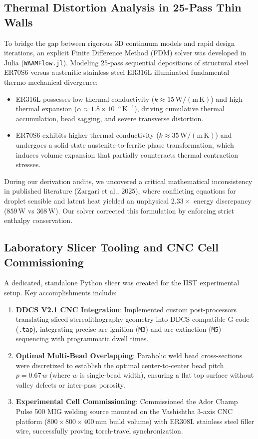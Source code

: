 \documentclass[10pt,a4paper]{article}
\begin{document}
\subsection{Thermal Distortion Analysis in 25-Pass Thin Walls}
To bridge the gap between rigorous 3D continuum models and rapid design iterations, an explicit Finite Difference Method (FDM) solver was developed in Julia (\texttt{WAAMFlow.jl}). Modeling 25-pass sequential depositions of structural steel ER70S6 versus austenitic stainless steel ER316L illuminated fundamental thermo-mechanical divergence:
\begin{itemize}
    \item ER316L possesses low thermal conductivity (\(k \approx 15\,\mathrm{W/(m\,K)}\)) and high thermal expansion (\(\alpha \approx 1.8\times 10^{-5}\,\mathrm{K^{-1}}\)), driving cumulative thermal accumulation, bead sagging, and severe transverse distortion.
    \item ER70S6 exhibits higher thermal conductivity (\(k \approx 35\,\mathrm{W/(m\,K)}\)) and undergoes a solid-state austenite-to-ferrite phase transformation, which induces volume expansion that partially counteracts thermal contraction stresses.
\end{itemize}

During our derivation audits, we uncovered a critical mathematical inconsistency in published literature (Zargari et al., 2025), where conflicting equations for droplet sensible and latent heat yielded an unphysical \(2.33\times\) energy discrepancy (\(859\,\mathrm{W}\) vs \(368\,\mathrm{W}\)). Our solver corrected this formulation by enforcing strict enthalpy conservation.

\subsection{Laboratory Slicer Tooling and CNC Cell Commissioning}
A dedicated, standalone Python slicer was created for the IIST experimental setup. Key accomplishments include:
\begin{enumerate}
    \item \textbf{DDCS V2.1 CNC Integration}: Implemented custom post-processors translating sliced stereolithography geometry into DDCS-compatible G-code (\texttt{.tap}), integrating precise arc ignition (\texttt{M3}) and arc extinction (\texttt{M5}) sequencing with programmatic dwell times.
    \item \textbf{Optimal Multi-Bead Overlapping}: Parabolic weld bead cross-sections were discretized to establish the optimal center-to-center bead pitch \(p = 0.67\,w\) (where \(w\) is single-bead width), ensuring a flat top surface without valley defects or inter-pass porosity.
    \item \textbf{Experimental Cell Commissioning}: Commissioned the Ador Champ Pulse 500 MIG welding source mounted on the Vashishtha 3-axis CNC platform (\(800\times 800\times 400\,\mathrm{mm}\) build volume) with ER308L stainless steel filler wire, successfully proving torch-travel synchronization.
\end{enumerate}
\end{document}
